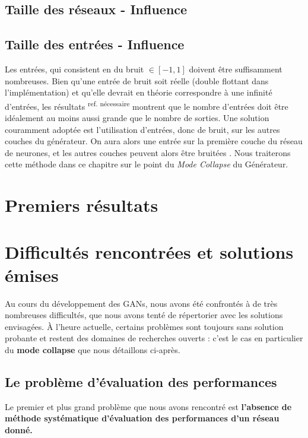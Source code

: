 \subsection{Taille des réseaux - Influence}



\subsection{Taille des entrées - Influence}

Les entrées, qui consistent en du bruit $\in [-1,1]$ doivent être suffisamment nombreuses. Bien qu'une entrée de bruit soit réelle (double flottant dans l'implémentation) et qu'elle devrait en théorie correspondre à une infinité d'entrées, les résultats \textsuperscript{ref. nécessaire} montrent que le nombre d'entrées doit être idéalement au moins aussi grande que le nombre de sorties.
Une solution couramment adoptée est l'utilisation d'entrées, donc de bruit, sur les autres couches du générateur. On aura alors une entrée sur la première couche du réseau de neurones, et les autres couches peuvent alors être bruitées \cite{goodfellow_nips_2016}. Nous traiterons cette méthode dans ce chapitre sur le point du \textit{Mode Collapse} du Générateur.

\section{Premiers résultats}



\section{Difficultés rencontrées et solutions émises}

Au cours du développement des GANs, nous avons été confrontés à de très nombreuses difficultés, que nous avons tenté de répertorier avec les solutions envisagées. À l'heure actuelle, certains problèmes sont toujours sans solution probante et restent des domaines de recherches ouverts : c'est le cas en particulier du \textbf{mode collapse} que nous détaillons ci-après.

\subsection{Le problème d'évaluation des performances}

Le premier et plus grand problème que nous avons rencontré est \textbf{l'absence de méthode systématique d'évaluation des performances d'un réseau donné.}

